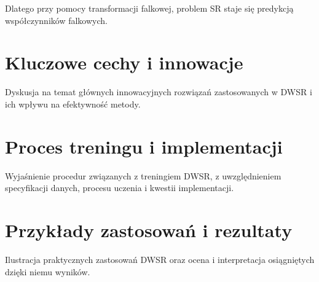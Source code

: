 Dlatego przy pomocy transformacji falkowej, problem SR staje się predykcją współczynników falkowych.


\section{Kluczowe cechy i innowacje}


Dyskusja na temat głównych innowacyjnych rozwiązań zastosowanych w DWSR i ich wpływu na efektywność metody.


\section{Proces treningu i implementacji}


Wyjaśnienie procedur związanych z treningiem DWSR, z uwzględnieniem specyfikacji danych, procesu uczenia i kwestii implementacji.


\section{Przykłady zastosowań i rezultaty}


Ilustracja praktycznych zastosowań DWSR oraz ocena i interpretacja osiągniętych dzięki niemu wyników.
